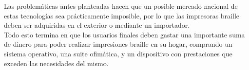 Las problem\'aticas antes planteadas hacen que un posible mercado nacional de
estas tecnolog\'ias sea pr\'acticamente imposible, por lo que las impresoras
braille deben ser adquiridas en el exterior o mediante un importador.\\

Todo esto termina en que los usuarios finales deben gastar una importante suma
de dinero para poder realizar impresiones braille en su hogar, comprando un
sistema operativo, una suite ofim\'atica, y un dispositivo con prestaciones
que exceden las necesidades del mismo.
